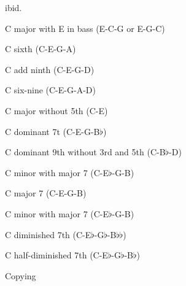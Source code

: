    ibid.\hfil\break

                                             C major with E in bass (E-C-G or E-G-C)\hfil\break

                                      C sixth (C-E-G-A)\hfil\break

                                      C add ninth (C-E-G-D)\hfil\break

                                    C six-nine (C-E-G-A-D)\hfil\break

                            C major without 5th (C-E)\hfil\break

                                      C dominant 7t (C-E-G-B$\flat$)\hfil\break

                 C dominant 9th without 3rd and 5th (C-B$\flat$-D)\hfil\break

                             C minor with major 7 (C-E$\flat$-G-B)\hfil\break

                              C major 7 (C-E-G-B)\hfil\break

                             C minor with major 7 (C-E$\flat$-G-B)\hfil\break

                                  C diminished 7th (C-E$\flat$-G$\flat$-B$\flat\flat$)\hfil\break

                           C half-diminished 7th (C-E$\flat$-G$\flat$-B$\flat$)\hfil\break

\vfil\eject
\centerline{\Largebx Copying}
\baselineskip
{}

\bye


